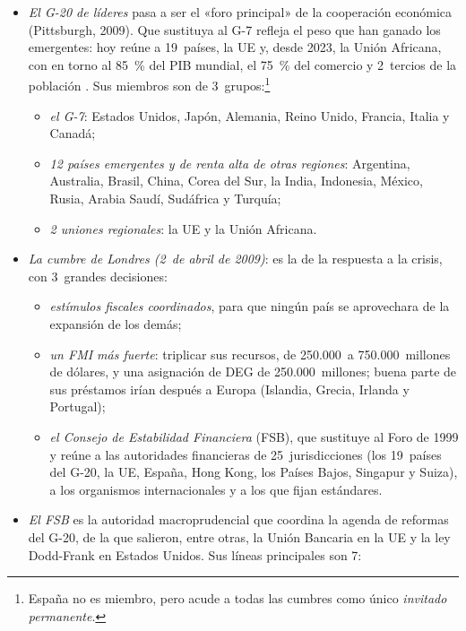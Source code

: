 \documentclass[11pt]{article}
\begin{document}
\begin{itemize}
\item \emph{El G-20 de líderes} pasa a ser el «foro principal» de la cooperación económica (Pittsburgh, 2009)\nocite{G20Pittsburgh2009}. Que sustituya al G-7 refleja el peso que han ganado los emergentes: hoy reúne a 19~países, la UE y, desde 2023, la Unión Africana, con en torno al 85~\% del PIB mundial, el 75~\% del comercio y 2~tercios de la población . Sus miembros son de 3~grupos:\footnote{España no es miembro, pero acude a todas las cumbres como único \emph{invitado permanente}.}
  \begin{itemize}
  \item \emph{el G-7}: Estados Unidos, Japón, Alemania, Reino Unido, Francia, Italia y Canadá;
  \item \emph{12 países emergentes y de renta alta de otras regiones}: Argentina, Australia, Brasil, China, Corea del Sur, la India, Indonesia, México, Rusia, Arabia Saudí, Sudáfrica y Turquía;
  \item \emph{2 uniones regionales}: la UE y la Unión Africana.
  \end{itemize}
\item \emph{La cumbre de Londres (2~de abril de 2009)}: es la de la respuesta a la crisis, con 3~grandes decisiones\nocite{G20Londres2009}:
  \begin{itemize}
  \item \emph{estímulos fiscales coordinados}, para que ningún país se aprovechara de la expansión de los demás;
  \item \emph{un FMI más fuerte}: triplicar sus recursos, de 250.000~a 750.000~millones de dólares, y una asignación de DEG de 250.000~millones; buena parte de sus préstamos irían después a Europa (Islandia, Grecia, Irlanda y Portugal);
  \item \emph{el Consejo de Estabilidad Financiera} (FSB), que sustituye al Foro de 1999 y reúne a las autoridades financieras de 25~jurisdicciones (los 19~países del G-20, la UE, España, Hong Kong, los Países Bajos, Singapur y Suiza), a los organismos internacionales y a los que fijan estándares.
  \end{itemize}
\item \emph{El FSB} es la autoridad macroprudencial que coordina la agenda de reformas del G-20, de la que salieron, entre otras, la Unión Bancaria en la UE y la ley Dodd-Frank en Estados Unidos. Sus líneas principales son 7\nocite{FSB2026Historia,FSB2025NBFI}:
  \begin{itemize}

\end{itemize}
\end{itemize}
\end{document}
